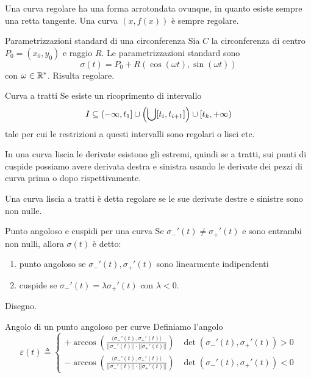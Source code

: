 \documentclass[a4paper]{article}
\begin{document}
Una curva regolare ha una forma arrotondata ovunque, in quanto esiste sempre una retta tangente.
Una curva \((x, f(x))\) è sempre regolare.

\begin{snippetexample}{Parametrizzazioni standard di una circonferenza}
    Sia \(C\) la circonferenza di centro \(P_0 = (x_0, y_0)\) e raggio \(R\).
    Le parametrizzazioni standard sono
    \[
        \sigma(t) = P_0 + R(\cos(\omega t), \sin(\omega t))
    \]
    con \(\omega \in \mathbb{R}^*\).
    Risulta regolare.
\end{snippetexample}

\begin{snippetdefinition}{Curva a tratti}
    Se esiste un ricoprimento di intervallo
    \[
        I \subseteq (-\infty, t_1] \cup \left(\bigcup [t_i, t_{i+1}]\right) \cup [t_k, +\infty)
    \]
    tale per cui le restrizioni a questi intervalli sono regolari o lisci etc.
\end{snippetdefinition}

In una curva liscia le derivate esistono gli estremi, quindi se a tratti, sui punti di cuspide possiamo
avere derivata destra e sinistra usando le derivate dei pezzi di curva prima o dopo rispettivamente.

\begin{snippetdefinition}{}
    Una curva liscia a tratti è detta regolare se le sue derivate destre e sinistre sono non nulle.
\end{snippetdefinition}

\begin{snippetdefinition}{Punto angoloso e cuspidi per una curva}
    Se \(\sigma_{-}'(t) \neq \sigma_{+}'(t)\) e sono entrambi non nulli,
    allora \(\sigma(t)\) è detto:
    \begin{enumerate}
        \item punto angoloso se \(\sigma_{-}'(t), \sigma_{+}'(t)\) sono linearmente indipendenti
        \item cuspide se \(\sigma_{-}'(t) = \lambda \sigma_{+}'(t)\) con \(\lambda < 0\).
    \end{enumerate}
    Disegno.
\end{snippetdefinition}

\begin{snippetdefinition}{Angolo di un punto angoloso per curve}
    Definiamo l'angolo
    \[
        \varepsilon(t) \triangleq \begin{cases}
            +\arccos \left(
                \frac{
                    \langle \sigma_{-}'(t), \sigma_{+}'(t)\rangle
                }{
                    ||\sigma_{-}'(t)|| \cdot ||\sigma_{+}'(t)||
                }
            \right) & \det(\sigma_{-}'(t), \sigma_{+}'(t)) > 0 \\
            -\arccos \left(
                \frac{
                    \langle \sigma_{-}'(t), \sigma_{+}'(t)\rangle
                }{
                    ||\sigma_{-}'(t)|| \cdot ||\sigma_{+}'(t)||
                }
            \right) & \det(\sigma_{-}'(t), \sigma_{+}'(t)) < 0
        \end{cases}
    \]
\end{snippetdefinition}
\end{document}
